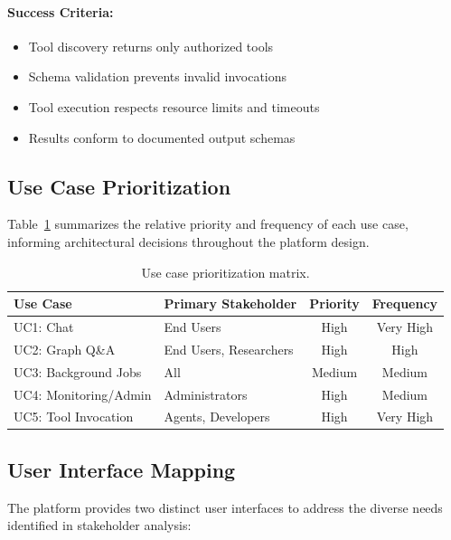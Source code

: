 \documentclass[a4paper,twoside]{sapthesis}
\begin{document}
\paragraph{Success Criteria:}
\begin{itemize}
    \item Tool discovery returns only authorized tools
    \item Schema validation prevents invalid invocations
    \item Tool execution respects resource limits and timeouts
    \item Results conform to documented output schemas
\end{itemize}

\subsection{Use Case Prioritization}

Table~\ref{tab:use-case-priority} summarizes the relative priority and frequency of each use case, informing architectural decisions throughout the platform design.

\begin{table}[ht]
\centering
\caption{Use case prioritization matrix.}
\label{tab:use-case-priority}
\small
\begin{tabular}{llcc}
\hline
\textbf{Use Case} & \textbf{Primary Stakeholder} & \textbf{Priority} & \textbf{Frequency} \\
\midrule
UC1: Chat & End Users & High & Very High \\
UC2: Graph Q\&A & End Users, Researchers & High & High \\
UC3: Background Jobs & All & Medium & Medium \\
UC4: Monitoring/Admin & Administrators & High & Medium \\
UC5: Tool Invocation & Agents, Developers & High & Very High \\
\midrule
\end{tabular}
\end{table}

\subsection{User Interface Mapping}

The platform provides two distinct user interfaces to address the diverse needs identified in stakeholder analysis:
\end{document}
